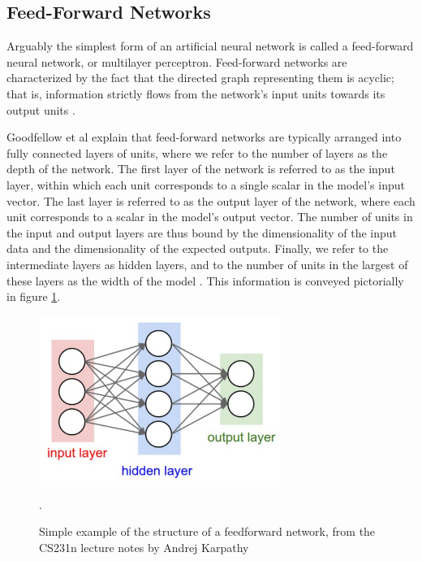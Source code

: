 \documentclass[12pt, titlepage]{report}
\theoremstyle{definition}
\begin{document}
\subsection{Feed-Forward Networks}
Arguably the simplest form of an artificial neural network is called a feed-forward neural network, or multilayer perceptron. Feed-forward networks are characterized by the fact that the directed graph representing them is acyclic; that is, information strictly flows from the network's input units towards its output units \cite[p. 164]{goodfellow2016deep}.

Goodfellow et al \cite{goodfellow2016deep} explain that feed-forward networks are typically arranged into fully connected layers of units, where we refer to the number of layers as the depth of the network. The first layer of the network is referred to as the input layer, within which each unit corresponds to a single scalar in the model's input vector. The last layer is referred to as the output layer of the network, where each unit corresponds to a scalar in the model's output vector. The number of units in the input and output layers are thus bound by the dimensionality of the input data and the dimensionality of the expected outputs. Finally, we refer to the intermediate layers as hidden layers, and to the number of units in the largest of these layers as the width of the model \cite[p. 164-165]{goodfellow2016deep}. This information is conveyed pictorially in figure \ref{figure:feedforward}.

\begin{figure}
\centering
\includegraphics[width=0.7\textwidth]{img/feedforward.png}\\
\caption{Simple example of the structure of a feedforward network, from the CS231n lecture notes by Andrej Karpathy \cite[Neural Networks Part 1 : Setting up the Architecture]{karpathy2017cs231n}}.
\label{figure:feedforward}
\end{figure}
\end{document}

